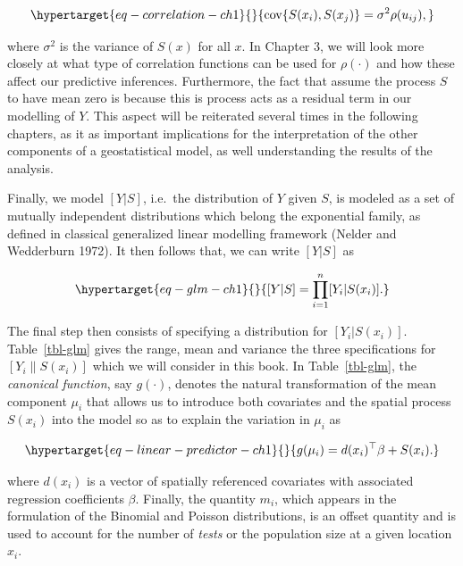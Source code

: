 \documentclass[
  letterpaper,
]{krantz}
\begin{document}
\begin{equation}\protect\hypertarget{eq-correlation-ch1}{}{
{\rm cov}\{S(x_i), S(x_j)\} = \sigma^2\rho(u_{ij}),
}\label{eq-correlation-ch1}\end{equation}

where \(\sigma^2\) is the variance of \(S(x)\) for all \(x\). In Chapter
3, we will look more closely at what type of correlation functions can
be used for \(\rho(\cdot)\) and how these affect our predictive
inferences. Furthermore, the fact that assume the process \(S\) to have
mean zero is because this is process acts as a residual term in our
modelling of \(Y\). This aspect will be reiterated several times in the
following chapters, as it as important implications for the
interpretation of the other components of a geostatistical model, as
well understanding the results of the analysis.

Finally, we model \([Y | S]\), i.e.~the distribution of \(Y\) given
\(S\), is modeled as a set of mutually independent distributions which
belong the exponential family, as defined in classical generalized
linear modelling framework (Nelder and Wedderburn 1972). It then follows
that, we can write \([Y | S]\) as

\begin{equation}\protect\hypertarget{eq-glm-ch1}{}{
[Y | S] = \prod_{i=1}^n [Y_i | S(x_i)].
}\label{eq-glm-ch1}\end{equation}

The final step then consists of specifying a distribution for
\([Y_i | S(x_i)]\). Table~\ref{tbl-glm} gives the range, mean and
variance the three specifications for \([Y_i \| S(x_i)]\) which we will
consider in this book. In Table~\ref{tbl-glm}, the \emph{canonical
function}, say \(g(\cdot)\), denotes the natural transformation of the
mean component \(\mu_i\) that allows us to introduce both covariates and
the spatial process \(S(x_i)\) into the model so as to explain the
variation in \(\mu_i\) as

\begin{equation}\protect\hypertarget{eq-linear-predictor-ch1}{}{
g(\mu_i) = d(x_i)^\top \beta + S(x_i).
}\label{eq-linear-predictor-ch1}\end{equation}

where \(d(x_i)\) is a vector of spatially referenced covariates with
associated regression coefficients \(\beta\). Finally, the quantity
\(m_i\), which appears in the formulation of the Binomial and Poisson
distributions, is an offset quantity and is used to account for the
number of \emph{tests} or the population size at a given location
\(x_i\).
\end{document}

